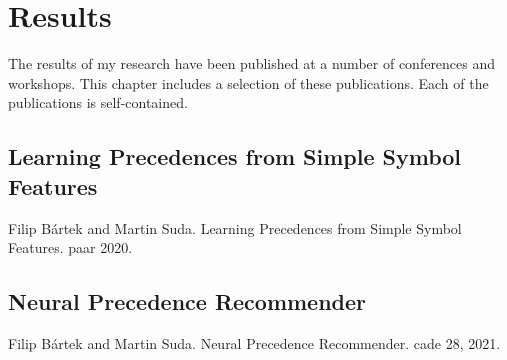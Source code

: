 \chapter{Results}

The results of my research have been published at a number of conferences and workshops.
This chapter includes a selection of these publications.
Each of the publications is self-contained.

%


\section{Learning Precedences from Simple Symbol Features}
\label{sec:results:simple}

Filip Bártek and Martin Suda. Learning Precedences from Simple Symbol Features. \Gls{paar} 2020. \cite{DBLP:conf/cade/Bartek020}




\section{Neural Precedence Recommender}
\label{sec:results:npr}

Filip Bártek and Martin Suda. Neural Precedence Recommender. \Gls{cade} 28, 2021. \cite{DBLP:conf/cade/Bartek021}

